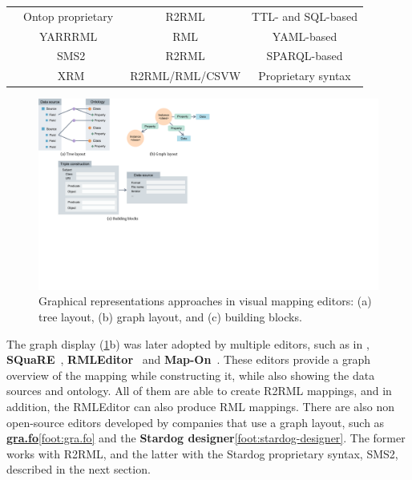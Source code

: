 \begin{table}[t]
{\begin{tabular}{cccc}
 & Ontop proprietary~\parencite{calvanese2017ontop} & R2RML & TTL- and SQL-based \\
 & YARRRML~\parencite{Heyvaert2018yarrrml} & RML & YAML-based \\
 & SMS2\tablefootnote{\label{foot:sms2}\url{https://docs.stardog.com/archive/7.5.0/virtual-graphs/mapping-data-sources.html\#sms2-stardog-mapping-syntax-2}} & R2RML & SPARQL-based \\
 & XRM\tablefootnote{\label{foot:xrm}\url{https://zazuko.com/products/expressive-rdf-mapper/}} & R2RML/RML/CSVW & Proprietary syntax \\ \bottomrule
\end{tabular}
}
\end{table}


\begin{figure}[t]
\centering
\includegraphics[width=0.9\linewidth]{figures/chp2_visual-editors.pdf}
\caption[Graphical representations approaches in visual mapping editors.]{Graphical representations approaches in visual mapping editors: (a) tree layout, (b) graph layout, and (c) building blocks.}
\label{fig:chp2_visual-editors}
\end{figure}


The graph display (\cref{fig:chp2_visual-editors}b) was later adopted by multiple editors, such as in \cite{lembo2014visualization}, \textbf{SQuaRE}~\parencite{blinkiewicz2016square}, \textbf{RMLEditor}~\parencite{heyvaert2016rmleditor} and \textbf{Map-On}~\parencite{sicilia2017map}. These editors provide a graph overview of the mapping while constructing it, while also showing the data sources and ontology. All of them are able to create R2RML mappings, and in addition, the RMLEditor can also produce RML mappings. There are also non open-source editors developed by companies that use a graph layout, such as \textbf{\url{gra.fo}}\cref{foot:gra.fo} and the \textbf{Stardog designer}\cref{foot:stardog-designer}. The former works with R2RML, and the latter with the Stardog proprietary syntax, SMS2, described in the next section. 

